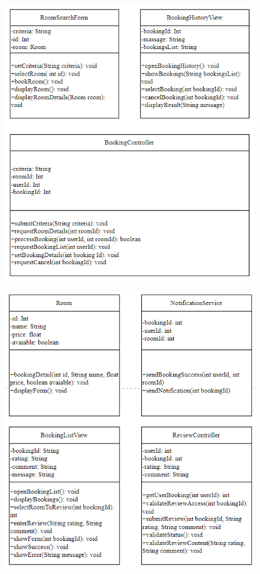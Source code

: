 \begin{figure}[H]
    \centering
    \includegraphics[width=\linewidth]{img3.6/5.png}
\end{figure}
\begin{figure}[H]
    \centering
    \includegraphics[width=\linewidth]{img3.6/6.png}
\end{figure}
